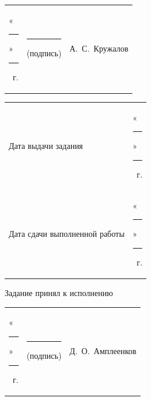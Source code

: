 \documentclass[14pt, a4paper]{extarticle}
\begin{document}
{
\renewcommand{\arraystretch}{2}
\noindent
\begin{tabularx}{\textwidth}{@{} P{0.45\textwidth} P{0.3\textwidth} P{0.25\textwidth} @{}}

    «\rule{0.8cm}{0.4pt}» \quad \rule{2cm}{0.4pt} ~г. &
    \centering \rule{3.5cm}{0.4pt} \par \footnotesize (подпись) &
    \hfill А.~С.~Кружалов                                         \\
\end{tabularx}

\begin{tabularx}{\textwidth}{@{} P{0.45\textwidth} P{0.55\textwidth} @{}}
    Дата выдачи задания           &
    \hfill «\rule{0.8cm}{0.4pt}» \quad \rule{2cm}{0.4pt} ~г. \\

    Дата сдачи выполненной работы &
    \hfill «\rule{0.8cm}{0.4pt}» \quad \rule{2cm}{0.4pt} ~г. \\
\end{tabularx}
}

Задание принял к исполнению\vspace{0cm}

{
\renewcommand{\arraystretch}{1.1}
\begin{tabularx}{\textwidth}{@{} P{0.45\textwidth} P{0.3\textwidth} P{0.25\textwidth} @{}}
    «\rule{0.8cm}{0.4pt}» \quad \rule{2cm}{0.4pt} ~г. &
    \centering \rule{3.5cm}{0.4pt} \par \footnotesize (подпись) &
    \hfill Д.~О.~Амплеенков                                      \\
\end{tabularx}
}
\end{document}
